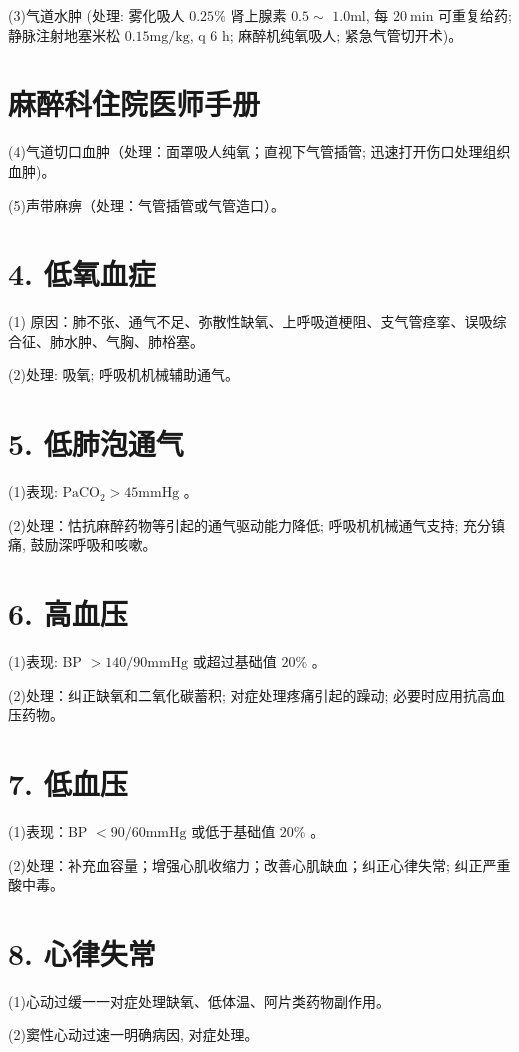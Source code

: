 \documentclass[10pt]{article}
\begin{document}
(3)气道水肿 (处理: 雾化吸人 $0.25 \%$ 肾上腺素 $0.5 \sim$ $1.0 \mathrm{ml}$, 每 $20 \mathrm{~min}$ 可重复给药; 静脉注射地塞米松 $0.15 \mathrm{mg} / \mathrm{kg}$, q 6 h; 麻醉机纯氧吸人; 紧急气管切开术)。

\section*{麻醉科住院医师手册}
(4)气道切口血肿（处理：面罩吸人纯氧；直视下气管插管; 迅速打开伤口处理组织血肿)。

(5)声带麻痹（处理：气管插管或气管造口）。

\section*{4. 低氧血症}
(1) 原因：肺不张、通气不足、弥散性缺氧、上呼吸道梗阻、支气管痉挛、误吸综合征、肺水肿、气胸、肺㭲塞。

(2)处理: 吸氧; 呼吸机机械辅助通气。

\section*{5. 低肺泡通气}
(1)表现: $\mathrm{PaCO}_{2}>45 \mathrm{mmHg}$ 。

(2)处理：怙抗麻醉药物等引起的通气驱动能力降低; 呼吸机机械通气支持; 充分镇痛, 鼓励深呼吸和咳嗽。

\section*{6. 高血压}
(1)表现: BP $>140 / 90 \mathrm{mmHg}$ 或超过基础值 $20 \%$ 。

(2)处理：纠正缺氧和二氧化碳蓄积; 对症处理疼痛引起的躁动; 必要时应用抗高血压药物。

\section*{7. 低血压}
(1)表现：BP $<90 / 60 \mathrm{mmHg}$ 或低于基础值 $20 \%$ 。

(2)处理：补充血容量；增强心肌收缩力；改善心肌缺血；纠正心律失常; 纠正严重酸中毒。

\section*{8. 心律失常}
(1)心动过缓一一对症处理缺氧、低体温、阿片类药物副作用。

(2)窦性心动过速一明确病因, 对症处理。
\end{document}
